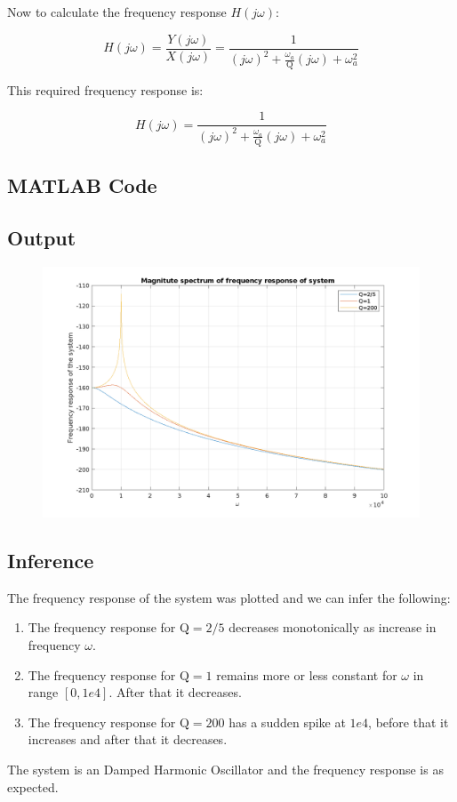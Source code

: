 Now to calculate the frequency response $H(j\omega)$:

\[
    H(j\omega) = \frac{Y(j\omega)}{X(j\omega)} = \frac{1}{(j\omega)^2 + \frac{\omega_a}{\mathrm{Q}}(j\omega) + \omega_a^2}
\]

This required frequency response is:

\[
    H(j\omega) = \frac{1}{(j\omega)^2 + \frac{\omega_a}{\mathrm{Q}}(j\omega) + \omega_a^2}
\]


\subsection*{MATLAB Code}




\subsection*{Output}

\begin{figure}[H]
    \centering
    \includegraphics[width = \textwidth]{./imgs/3_mems_freq_resp.png}
\end{figure}

\pagebreak
\subsection*{Inference}

The frequency response of the system was plotted and we can infer the following:

\begin{enumerate}
    \item The frequency response for $\mathrm{Q} = 2/5$ decreases monotonically as increase in frequency $\omega$.
    \item The frequency response for $\mathrm{Q} = 1$ remains more or less constant for $\omega$ in range $[0, 1e4]$. After that it decreases.
    \item The frequency response for $\mathrm{Q} = 200$ has a sudden spike at $1e4$, before that it increases and after that it decreases.
\end{enumerate}

The system is an Damped Harmonic Oscillator and the frequency response is as expected.